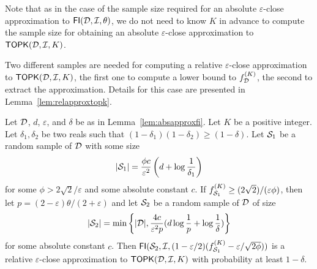 Note that as in the case of the sample size required
for an absolute $\varepsilon$-close approximation to $\mathsf{FI}({\cal D},{\cal I},\theta)$, we do
not need to know $K$ in advance to compute the sample size for obtaining
an absolute $\varepsilon$-close approximation to $\mathsf{TOPK}({\cal D},{\cal I},K)$.

Two different samples are needed for computing a relative
$\varepsilon$-close approximation to $\mathsf{TOPK}({\cal D},{\cal I},K)$, the first one to compute a
lower bound to $f_{\cal D}^{(K)}$, the second to extract the approximation. Details
for this case are presented in Lemma~\ref{lem:relapproxtopk}.

\begin{lemma}\label{lem:relapproxtopk}
  Let ${\cal D}$, $d$, $\varepsilon$, and $\delta$ be as in Lemma~\ref{lem:absapproxfi}.
  Let $K$ be a positive integer. Let $\delta_1,\delta_2$ be two reals such that
  $(1-\delta_1)(1-\delta_2)\ge(1-\delta)$. Let ${\cal S}_1$ be a random sample of
  ${\cal D}$ with some size
  \[
  |{\cal S}_1|=\frac{\phi c}{\varepsilon^2}\left(d+\log\frac{1}{\delta_1}\right)\]
  for some $\phi>2\sqrt{2}/\varepsilon$ and some absolute constant $c$. If
  $f_{{\cal S}_1}^{(K)}\ge (2\sqrt{2})/(\varepsilon\phi)$, then let
  $p=(2-\varepsilon)\theta/(2+\varepsilon)$ and let ${\cal S}_2$ be
  a random sample of ${\cal D}$ of size 
  \[ |{\cal S}_2|=\min\left\{|{\cal D}|,
  \frac{4c}{\varepsilon^2p}(d\log\frac{1}{p} + \log\frac{1}{\delta})\right\}\]
  for some
  absolute constant $c$. Then
  $\mathsf{FI}({\cal S}_2,{\cal I},(1-\varepsilon/2)(f_{{\cal S}_1}^{(K)}-\varepsilon/\sqrt{2\phi}))$
  is a relative $\varepsilon$-close approximation to $\mathsf{TOPK}({\cal D},{\cal I},K)$ with
  probability at least $1-\delta$.
\end{lemma}

